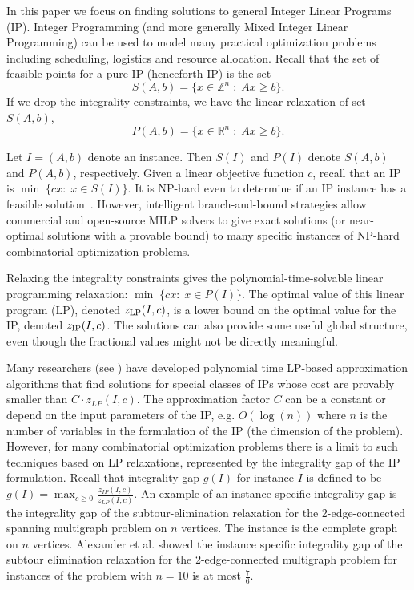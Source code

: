 In this paper we focus on finding solutions to general Integer Linear Programs (IP). Integer Programming (and more generally Mixed Integer Linear Programming) can be used to model many practical optimization problems including scheduling, logistics and resource allocation. Recall that the set of feasible points for a pure IP (henceforth IP) is the set
\begin{equation}
S(A,b)= \{x\in \mathbb{Z}^{n}\;:\; Ax\geq b\}  \label{S}.
\end{equation}
If we drop the integrality constraints, we have the linear relaxation of set $S(A,b)$,
\begin{equation}
P(A,b) = \{x\in \mathbb{R}^{n}\;:\; Ax\geq b\}. \label{P}
\end{equation}

Let $I=(A,b)$ denote an instance. Then $S(I)$ and $P(I)$ denote $S(A,b)$ and $P(A,b)$, respectively. Given a linear objective function $c$, recall that an IP is $\min \;\{cx:\; x \in S(I)\}$. It is  NP-hard even to determine if an IP instance has a feasible solution~\cite{GareyJohnson}. However, intelligent branch-and-bound strategies allow commercial and open-source MILP solvers to give exact solutions (or near-optimal solutions with a provable bound) to many specific instances of NP-hard combinatorial optimization problems. 

Relaxing the integrality constraints gives the polynomial-time-solvable linear programming relaxation: $\min \;\{cx:\;x\in P(I) \}$.  The optimal value of this linear program (LP), denoted $z_{\operatorname{LP}}(I,c)$, is a lower bound on the optimal value for the IP, denoted $z_{\operatorname{IP}}(I,c)$. The solutions can also provide some useful global structure, even though the fractional values might not be directly meaningful. 

Many researchers (see \cite{davids,vazirani}) have developed polynomial time LP-based approximation algorithms that find solutions for special classes of IPs whose cost are provably smaller than $C\cdot z_{LP}(I,c)$. The approximation factor $C$ can be a constant or depend on the input parameters of the IP, e.g. $O(\log(n))$ where $n$ is the number of variables in the formulation of the IP (the dimension of the problem). However, for many combinatorial optimization problems there is a limit to such techniques based on LP relaxations, represented  by the {integrality gap} of the IP formulation. Recall that integrality gap $g(I)$ for instance $I$ is defined to be $g(I)= \max_{c\geq 0}\frac{z_{IP}(I,c)}{z_{LP}(I,c)}$.  An example of an instance-specific integrality gap is the integrality gap of the subtour-elimination relaxation for the 2-edge-connected spanning multigraph problem on $n$ vertices.  The instance is the complete graph on $n$ vertices. Alexander et al. \cite{alexander2006integrality} showed the instance specific integrality gap of the subtour elimination relaxation for the 2-edge-connected multigraph problem for instances of the problem with $n= 10$ is at most $\frac{7}{6}$.

